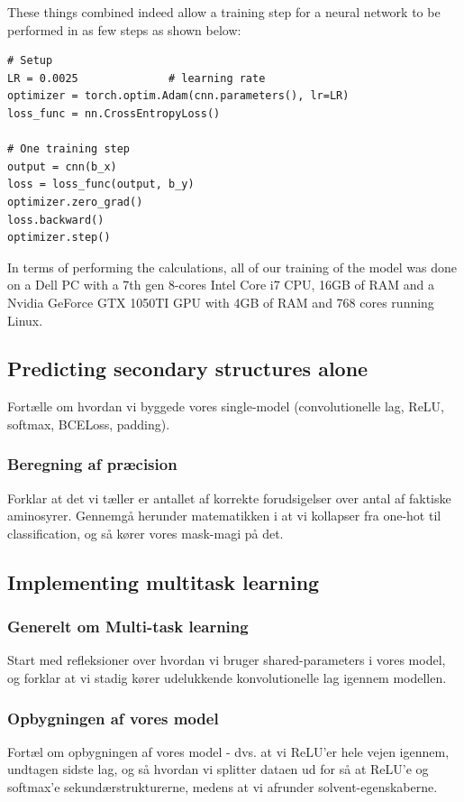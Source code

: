 These things combined indeed allow a training step for a neural network to be performed in as few steps as shown below:
\begin{lstlisting}
# Setup
LR = 0.0025              # learning rate
optimizer = torch.optim.Adam(cnn.parameters(), lr=LR)
loss_func = nn.CrossEntropyLoss()

# One training step
output = cnn(b_x)
loss = loss_func(output, b_y)
optimizer.zero_grad()
loss.backward()
optimizer.step()
\end{lstlisting}
In terms of performing the calculations, all of our training of the model was done on a Dell PC with a 7th gen 8-cores Intel Core i7 CPU, 16GB of RAM and a Nvidia GeForce GTX 1050TI GPU with 4GB of RAM and 768 cores running Linux.

\subsection{Predicting secondary structures alone}
Fortælle om hvordan vi byggede vores single-model (convolutionelle lag, ReLU, softmax, BCELoss, padding).

\subsubsection{Beregning af præcision}
Forklar at det vi tæller er antallet af korrekte forudsigelser over antal af faktiske aminosyrer. Gennemgå herunder matematikken i at vi kollapser fra one-hot til classification, og så kører vores mask-magi på det.

\subsection{Implementing multitask learning}
\subsubsection{Generelt om Multi-task learning}
Start med refleksioner over hvordan vi bruger shared-parameters i vores model, og forklar at vi stadig kører udelukkende konvolutionelle lag igennem modellen.
\subsubsection{Opbygningen af vores model}
Fortæl om opbygningen af vores model - dvs. at vi ReLU'er hele vejen igennem, undtagen sidste lag, og så hvordan vi splitter dataen ud for så at ReLU'e og softmax'e sekundærstrukturerne, medens at vi afrunder solvent-egenskaberne.

